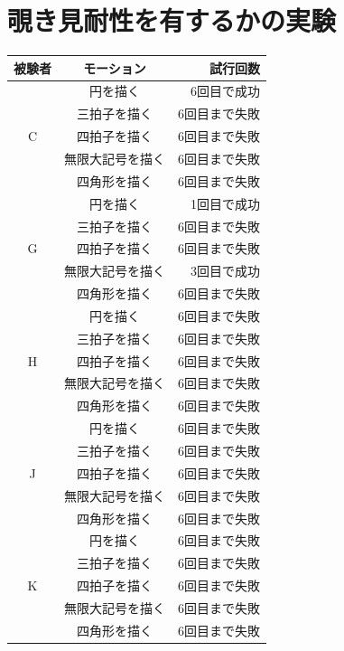 \documentclass[11pt]{jreport}
\begin{document}
\section{覗き見耐性を有するかの実験}
\label{spoofingDetail}
        \begin{center}
            \begin{longtable}{|c|c|r|}
            \hline
                被験者 & モーション & 試行回数 \\ \hline \hline \endhead
                  & 円を描く & 6回目で成功 \\ \cline{2-3} %
                  & 三拍子を描く & 6回目まで失敗 \\ \cline{2-3}
                C & 四拍子を描く & 6回目まで失敗 \\ \cline{2-3}
                  & 無限大記号を描く & 6回目まで失敗 \\ \cline{2-3}
                  & 四角形を描く & 6回目まで失敗 \\ \hline %
                  & 円を描く & 1回目で成功 \\ \cline{2-3} %
                  & 三拍子を描く & 6回目まで失敗 \\ \cline{2-3}
                G & 四拍子を描く & 6回目まで失敗 \\ \cline{2-3}
                  & 無限大記号を描く & 3回目で成功 \\ \cline{2-3}
                  & 四角形を描く & 6回目まで失敗 \\ \hline %
                  & 円を描く & 6回目まで失敗 \\ \cline{2-3} %
                  & 三拍子を描く & 6回目まで失敗 \\ \cline{2-3}
                H & 四拍子を描く & 6回目まで失敗 \\ \cline{2-3}
                  & 無限大記号を描く & 6回目まで失敗 \\ \cline{2-3}
                  & 四角形を描く & 6回目まで失敗 \\ \hline %
                  & 円を描く & 6回目まで失敗 \\ \cline{2-3} %
                  & 三拍子を描く & 6回目まで失敗 \\ \cline{2-3}
                J & 四拍子を描く & 6回目まで失敗 \\ \cline{2-3}
                  & 無限大記号を描く & 6回目まで失敗 \\ \cline{2-3}
                  & 四角形を描く & 6回目まで失敗 \\ \hline %
                  & 円を描く & 6回目まで失敗 \\ \cline{2-3} %
                  & 三拍子を描く & 6回目まで失敗 \\ \cline{2-3}
                K & 四拍子を描く & 6回目まで失敗 \\ \cline{2-3}
                  & 無限大記号を描く & 6回目まで失敗 \\ \cline{2-3}
                  & 四角形を描く & 6回目まで失敗 \\ \hline %
            \end{longtable}
        \end{center}
\end{document}
